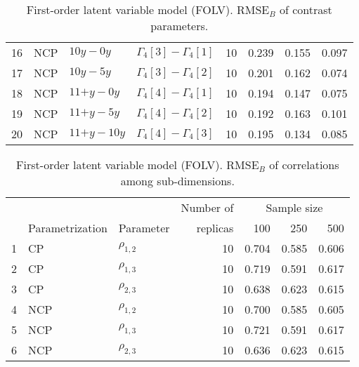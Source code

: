 \begin{table}[H]
\begin{tabular}{rlllrrrr}
		16 & NCP & \footnotesize{$10y - 0y$} & $\Gamma_{4}[3] - \Gamma_{4}[1]$ &   10 & 0.239 & 0.155 & 0.097 \\ 
		17 & NCP & \footnotesize{$10y - 5y$} & $\Gamma_{4}[3] - \Gamma_{4}[2]$ &   10 & 0.201 & 0.162 & 0.074 \\ 
		18 & NCP & \footnotesize{$11\text{+}y - 0y$} & $\Gamma_{4}[4] - \Gamma_{4}[1]$ &   10 & 0.194 & 0.147 & 0.075 \\ 
		19 & NCP & \footnotesize{$11\text{+}y - 5y$} & $\Gamma_{4}[4] - \Gamma_{4}[2]$ &   10 & 0.192 & 0.163 & 0.101 \\ 
		20 & NCP & \footnotesize{$11\text{+}y - 10y$} & $\Gamma_{4}[4] - \Gamma_{4}[3]$ &   10 & 0.195 & 0.134 & 0.085 \\ 
		\hline
	\end{tabular}
	\caption[First-order latent variable model (FOLV). $\text{RMSE}_{B}$ of contrast parameters.]%
	{First-order latent variable model (FOLV). $\text{RMSE}_{B}$ of contrast parameters.} 
	\label{tab:FOLV_RMSE_contrasts}
\end{table}
%
\begin{table}[H]
	\centering
	\begin{tabular}{rllrrrr}
		\hline
		\multicolumn{3}{c}{ } & Number of &\multicolumn{3}{c}{ Sample size } \\ 
		\cmidrule(rl){5-7}
		& Parametrization  & Parameter & replicas & 100 & 250 & 500 \\  
		\hline\hline
		1 & CP & $\rho_{1,2}$ &  10 & 0.704 & 0.585 & 0.606 \\ 
		2 & CP & $\rho_{1,3}$ &  10 & 0.719 & 0.591 & 0.617 \\ 
		3 & CP & $\rho_{2,3}$ &  10 & 0.638 & 0.623 & 0.615 \\
		\hline
		4 & NCP & $\rho_{1,2}$ &  10 & 0.700 & 0.585 & 0.605 \\ 
		5 & NCP & $\rho_{1,3}$ &  10 & 0.721 & 0.591 & 0.617 \\
		6 & NCP & $\rho_{2,3}$ &  10 & 0.636 & 0.623 & 0.615 \\ 
		\hline
	\end{tabular}
	\caption[First-order latent variable model (FOLV). $\text{RMSE}_{B}$ of correlations among sub-dimensions.]%
	{First-order latent variable model (FOLV). $\text{RMSE}_{B}$ of correlations among sub-dimensions.}
	\label{tab:FOLV_RMSE_corr}
\end{table}
%
